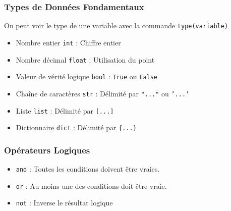 \subsubsection{Types de Données Fondamentaux}

On peut voir le type de une variable avec la commande \texttt{type(variable)}

\begin{itemize}
\item Nombre entier \texttt{int} : Chiffre entier
\item Nombre décimal \texttt{float} : Utilisation du point
\item Valeur de vérité logique \texttt{bool} : \texttt{True} ou \texttt{False}
\item Chaîne de caractères \texttt{str} : Délimité par \texttt{"..."} ou \texttt{'...'}
\item Liste \texttt{list} : Délimité par \texttt{[...]}
\item Dictionnaire \texttt{dict} : Délimité par \texttt{\{...\}}
\end{itemize}

\subsubsection{Opérateurs Logiques}

\begin{itemize}
\item \texttt{and} : Toutes les conditions doivent être vraies.
\item \texttt{or} : Au moins une des conditions doit être vraie.
\item \texttt{not} : Inverse le résultat logique
\end{itemize}